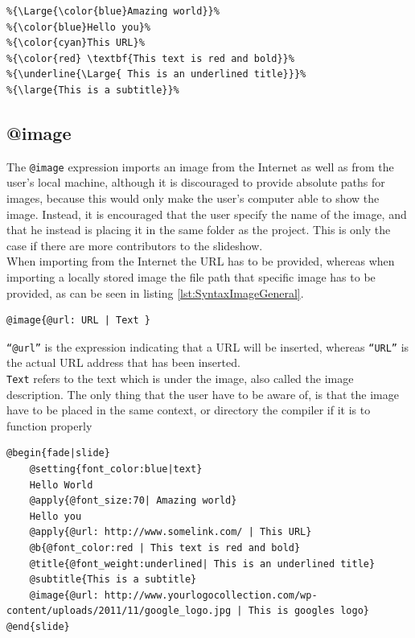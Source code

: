 {\begin{lstlisting}[frame=single, caption=Hello World with subtitle, label=lst:SyntaxSubtitle]
%Output: {\color{blue}Hello World}%
%{\Large{\color{blue}Amazing world}}%
%{\color{blue}Hello you}%
%{\color{cyan}This URL}%
%{\color{red} \textbf{This text is red and bold}}%
%{\underline{\Large{ This is an underlined title}}}%
%{\large{This is a subtitle}}%
\end{lstlisting}

\subsection{@image}
The \texttt{@image} expression imports an image from the Internet as well as from the user's local machine, although it is discouraged to provide absolute paths for images, because this would only make the user's computer able to show the image. Instead, it is encouraged that the user specify the name of the image, and that he instead is placing it in the same folder as the project. This is only the case if there are more contributors to the slideshow.\\
When importing from the Internet the URL has to be provided, whereas when importing a locally stored image the file path that specific image has to be provided, as can be seen in listing \ref{lst:SyntaxImageGeneral}.

\begin{lstlisting}[frame=single, caption=Image expression generic, label=lst:SyntaxImageGeneral]
@image{@url: URL | Text }
\end{lstlisting}

\texttt{``@url''} is the expression indicating that a URL will be inserted, whereas \texttt{``URL''} is the actual URL address that has been inserted. \\
\texttt{Text} refers to the text which is under the image, also called the image description.
The only thing that the user have to be aware of, is that the image have to be placed in the same context, or directory the compiler if it is to function properly

\begin{lstlisting}[frame=single, caption=Hello World with an image, label=lst:SyntaxImage]
@begin{fade|slide}
    @setting{font_color:blue|text}
    Hello World
    @apply{@font_size:70| Amazing world}
    Hello you
    @apply{@url: http://www.somelink.com/ | This URL}
    @b{@font_color:red | This text is red and bold}
    @title{@font_weight:underlined| This is an underlined title}
    @subtitle{This is a subtitle}
    @image{@url: http://www.yourlogocollection.com/wp-content/uploads/2011/11/google_logo.jpg | This is googles logo}
@end{slide}


\end{lstlisting}}
